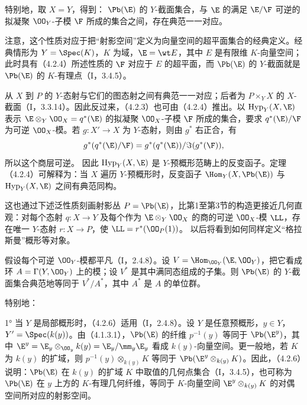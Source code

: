 特别地，取 $X=Y$，得到：
$\Pb(\E)$ 的 $Y$-截面集合，与 $\E$ 的满足 $\E/\F$ 可逆的拟凝聚 $\OO_Y$-子模 $\F$ 所成的集合之间，存在典范一一对应。

注意，这个性质对应于把“射影空间”定义为向量空间的超平面集合的经典定义。经典情形为 $Y=\Spec(K)$，$K$ 为域，$\E=\wt E$，其中 $E$ 是有限维 $K$-向量空间；此时具有（4.2.4）所述性质的 $\F$ 对应于 $E$ 的超平面，而 $\Pb(\E)$ 的 $Y$-截面就是 $\Pb(\E)$ 的 $K$-有理点（I，3.4.5）。

从 $X$ 到 $P$ 的 $Y$-态射与它们的图态射之间有典范一一对应；后者为 $P\times_Y X$ 的 $X$-截面（I，3.3.14）。因此反过来，（4.2.3）也可由（4.2.4）推出。以 $\operatorname{Hyp}_Y(X,\E)$ 表示 $\E\otimes_Y\OO_X=q^*(\E)$ 的拟凝聚 $\OO_X$-子模 $\F$ 所成的集合，要求 $q^*(\E)/\F$ 为可逆 $\OO_X$-模。若 $g:X'\to X$ 为 $Y$-态射，则由 $g^*$ 右正合，有
\[
g^*(q^*(\E)/\F)=g^*(q^*(\E))/\Im(g^*(\F)),
\]
所以这个商层可逆。
因此 $\operatorname{Hyp}_Y(X,\E)$ 是 $Y$-预概形范畴上的反变函子。定理（4.2.4）可解释为：当 $X$ 遍历 $Y$-预概形时，反变函子 $\Hom_Y(X,\Pb(\E))$ 与 $\operatorname{Hyp}_Y(X,\E)$ 之间有典范同构。

这也通过下述泛性质刻画射影丛 $P=\Pb(\E)$，比第1至第3节的构造更接近几何直观：对每个态射 $q:X\to Y$ 及每个作为 $\E\otimes_Y\OO_X$ 的商的可逆 $\OO_X$-模 $\LL$，存在唯一 $Y$-态射 $r:X\to P$，使 $\LL=r^*(\OO_P(1))$。
以后将看到如何同样定义“格拉斯曼”概形等对象。

假设每个可逆 $\OO_Y$-模都平凡（I，2.4.8）。设 $V=\Hom_{\OO_Y}(\E,\OO_Y)$，把它看成环 $A=\Gamma(Y,\OO_Y)$ 上的模；设 $V^*$ 是其中满同态组成的子集。则 $\Pb(\E)$ 的 $Y$-截面集合典范地等同于 $V^*/A^*$，其中 $A^*$ 是 $A$ 的单位群。

特别地：

1° 当 $Y$ 是局部概形时，（4.2.6）适用（I，2.4.8）。设 $Y$ 是任意预概形，$y\in Y$，$Y'=\Spec(k(y))$。由（4.1.3.1），$\Pb(\E)$ 的纤维 $p^{-1}(y)$ 等同于 $\Pb(\E^y)$，其中
$\E^y=\E_y\otimes_{\OO_y}k(y)=\E_y/\mm_y\E_y$ 看成 $k(y)$-向量空间。更一般地，若 $K$ 为 $k(y)$ 的扩域，则 $p^{-1}(y)\otimes_{k(y)}K$ 等同于 $\Pb(\E^y\otimes_{k(y)}K)$。因此，（4.2.6）说明：$\Pb(\E)$ 在 $k(y)$ 的扩域 $K$ 中取值的几何点集合（I，3.4.5），也可称为 $\Pb(\E)$ 在 $y$ 上方的 $K$-有理几何纤维，等同于 $K$-向量空间 $\E^y\otimes_{k(y)}K$ 的对偶空间所对应的射影空间。

